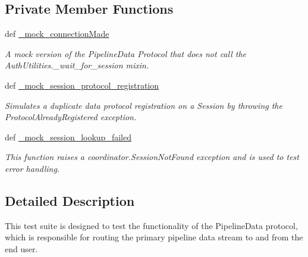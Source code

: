 \subsection*{Private Member Functions}
\begin{DoxyCompactItemize}
\item 
def \hyperlink{classhwm_1_1network_1_1protocols_1_1tests_1_1test__data__protocol_1_1_test_pipeline_data_protocol_a94c07cc47c7ada6de1e11f394f84e2a9}{\-\_\-mock\-\_\-connection\-Made}
\begin{DoxyCompactList}\small\item\em A mock version of the Pipeline\-Data Protocol that does not call the Auth\-Utilities.\-\_\-wait\-\_\-for\-\_\-session mixin. \end{DoxyCompactList}\item 
def \hyperlink{classhwm_1_1network_1_1protocols_1_1tests_1_1test__data__protocol_1_1_test_pipeline_data_protocol_a557fd2ae88224483b2e4e98d63a84c4e}{\-\_\-mock\-\_\-session\-\_\-protocol\-\_\-registration}
\begin{DoxyCompactList}\small\item\em Simulates a duplicate data protocol registration on a Session by throwing the Protocol\-Already\-Registered exception. \end{DoxyCompactList}\item 
\hypertarget{classhwm_1_1network_1_1protocols_1_1tests_1_1test__data__protocol_1_1_test_pipeline_data_protocol_a661256d981b866283456b26ac3a5af8f}{def \hyperlink{classhwm_1_1network_1_1protocols_1_1tests_1_1test__data__protocol_1_1_test_pipeline_data_protocol_a661256d981b866283456b26ac3a5af8f}{\-\_\-mock\-\_\-session\-\_\-lookup\-\_\-failed}}\label{classhwm_1_1network_1_1protocols_1_1tests_1_1test__data__protocol_1_1_test_pipeline_data_protocol_a661256d981b866283456b26ac3a5af8f}

\begin{DoxyCompactList}\small\item\em This function raises a coordinator.\-Session\-Not\-Found exception and is used to test error handling. \end{DoxyCompactList}\end{DoxyCompactItemize}


\subsection{Detailed Description}
This test suite is designed to test the functionality of the Pipeline\-Data protocol, which is responsible for routing the primary pipeline data stream to and from the end user. 

